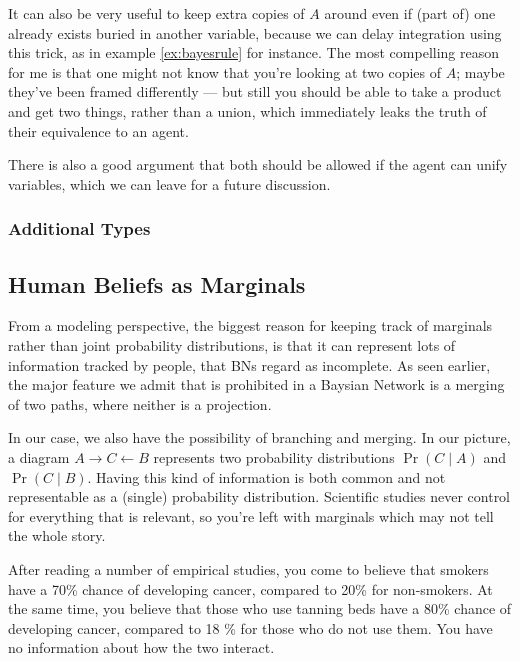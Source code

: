 \documentclass{article}
\begin{document}
	It can also be very useful to keep extra copies of $A$ around even if (part of) one already exists buried in another variable, because we can delay integration using this trick, as in example \ref{ex:bayesrule} for instance. The most compelling reason for me is that one might not know that you're looking at two copies of $A$; maybe they've been framed differently --- but still you should be able to take a product and get two things, rather than a union, which immediately leaks the truth of their equivalence to an agent.
	
	There is also a good argument that both should be allowed if the agent can unify variables, which we can leave for a future discussion.
	
	\subsubsection{Additional Types}

		\subsection{Human Beliefs as Marginals}\label{sec:human-belief-marginals}
	From a modeling perspective, the biggest reason for keeping track of marginals rather than joint probability distributions, is that it can represent lots of information tracked by people, that BNs regard as incomplete. As seen earlier, the major feature we admit that is prohibited in a Baysian Network is a merging of two paths, where neither is a projection.
	
	In our case, we also have the possibility of branching and merging. In our picture, a diagram $A \rightarrow C \leftarrow B$ represents two probability distributions $\Pr(C\mid A)$ and $\Pr(C \mid B)$.
	Having this kind of information is both common and not representable as a (single) probability distribution. Scientific studies never control for everything that is relevant, so you're left with marginals which may not tell the whole story.
	
	\begin{example}
		After reading a number of empirical studies, you come to believe that smokers have a 70\% chance of developing cancer, compared to 20\% for non-smokers. At the same time, you believe that those who use tanning beds have a 80\% chance of developing cancer, compared to 18 \% for those who do not use them. You have no information about how the two interact.
	\end{example}
	
\end{document}
